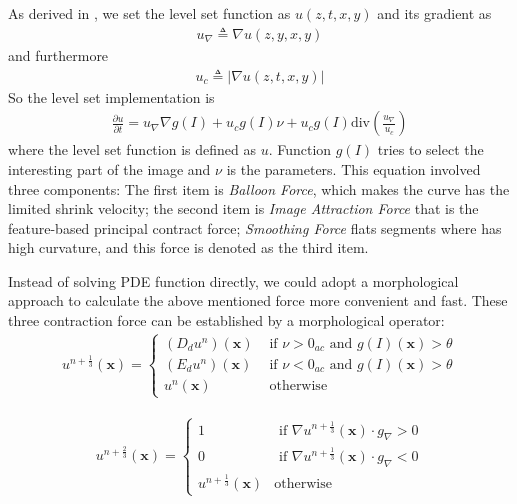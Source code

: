 As derived in \cite{Marquez-Neila2014}, we set the level set function as $u(z, t, x, y)$ and its gradient as
\begin{align}
u_{\nabla} \triangleq \nabla u(z, y, x, y)
\end{align}
and furthermore
\begin{align}
u_c \triangleq |\nabla u(z, t, x, y)|
\end{align}
So the level set implementation is 
\begin{align}
	\frac{\partial u}{\partial t} = u_{\nabla} \nabla g(I)  + u_cg(I)\nu +u_cg(I)\text{div}(\frac{u_{\nabla}}{u_c})
\end{align}
where the level set function is defined as $u$.  Function $g(I)$ tries to select the interesting part of the image and $\nu$ is the parameters. This equation involved three components: The first item is \textit{Balloon Force}, which makes the curve has the limited shrink velocity; the second item is \textit{Image Attraction Force} that is the feature-based principal contract force; \textit{Smoothing Force} flats segments where has high curvature, and this force is denoted as the third item.

Instead of solving PDE function directly, we could adopt a morphological approach to calculate the above mentioned force more convenient and fast. These three contraction force can be established by a morphological operator:
\begin{align}
	\label{eq:PDE_1_3}
	u^{n+\frac{1}{3}}(\mathbf{x})=\left\{ \begin{array}{ll}
		(D_du^n)(\mathbf{x}) &\mbox{ if $\nu>0_{ac}$ and $g(I)(\mathbf{x})>\theta$} \\
		(E_du^n)(\mathbf{x}) &\mbox{ if $\nu<0_{ac}$ and $g(I)(\mathbf{x})>\theta$} \\
		u^{n}(\mathbf{x}) &\mbox{ otherwise}
	\end{array} \right.
\end{align}

\begin{align}
	\label{eq:PDE_2_3}
	u^{n+\frac{2}{3}}(\mathbf{x})=\left\{ \begin{array}{ll}
		1 &\mbox{ if $\nabla u^{n+\frac{1}{3}}(\mathbf{x}) \cdot g_{\nabla} > 0$} \\
		0&\mbox{ if $\nabla u^{n+\frac{1}{3}}(\mathbf{x})  \cdot g_{\nabla}  < 0$} \\
		u^{n+\frac{1}{3}}(\mathbf{x}) &\mbox{otherwise}
	\end{array} \right.
\end{align}

